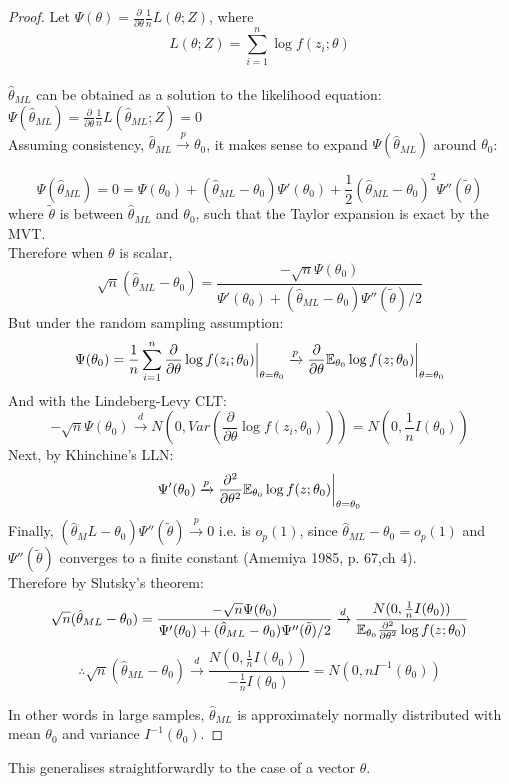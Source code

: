 \documentclass[DIV=14,titlepage=false]{scrreprt}
\begin{document}
\begin{proof}
Let \(\Psi(\theta)=\frac{\partial}{\partial\theta}\frac{1}{n}L (\theta;Z)\), where
\[L(\theta;Z)=\sum_{i=1}^n\log f(z_i;\theta)\]
\\\(\hat{\theta}_{ML}\) can be obtained as a solution to the likelihood equation: \(\Psi(\hat{\theta}_{ML})=\frac{\partial}{\partial\theta}\frac{1}{n}L (\hat\theta_{ML};Z)=0\)
\\ Assuming consistency, \(\hat{\theta}_{ML}\xrightarrow{p}\theta_0\), it makes sense to expand \(\Psi(\hat{\theta}_{ML})\) around \(\theta_0\):

\[\Psi(\hat{\theta}_{ML})=0=\Psi(\theta_0)+(\hat{\theta}_{ML}-\theta_0)\Psi'(\theta_0)+\frac{1}{2}(\hat{\theta}_{ML}-\theta_0)^2\Psi''(\tilde{\theta})\]
where \(\tilde{\theta}\) is between \(\hat{\theta}_{ML}\) and \(\theta_0\), such that the Taylor expansion is exact by the MVT.
\\Therefore when \(\theta\) is scalar,
\[\sqrt{n}(\hat{\theta}_{ML}-\theta_0)=\frac{-\sqrt{n}\Psi(\theta_0)}{\Psi'(\theta_0)+(\hat{\theta}_{ML}-\theta_0)\Psi''(\tilde{\theta})/2}\]
But under the random sampling assumption:
\[\Psi(\theta_0)=\frac{1}{n}\sum_{i=1}^n\frac{\partial}{\partial\theta}\log f(z_i;\theta_0)\bigg|_{\theta=\theta_0}\xrightarrow{p}\frac{\partial}{\partial\theta}\mathbb{E}_{\theta_0}\log f(z;\theta_0)\bigg|_{\theta=\theta_0}\]
And with the Lindeberg-Levy CLT:
\[-\sqrt{n}\Psi(\theta_0)\xrightarrow{d}N\left(0,Var\left(\frac{\partial}{\partial\theta}\log f(z_i,\theta_0)\right)\right)=N\left(0,\frac{1}{n}I(\theta_0)\right)\]
Next, by Khinchine's LLN:
\[\Psi'(\theta_0)\xrightarrow{p}\frac{\partial^2}{\partial\theta^2}\mathbb{E}_{\theta_0}\log f(z;\theta_0)\bigg|_{\theta=\theta_0}\]
Finally, \(({\hat\theta_ML}-\theta_0)\Psi''(\tilde{\theta})\xrightarrow{p}0\) i.e. is \(o_p(1)\), since \(\hat{\theta}_{ML}-\theta_0 = o_p(1)\) and \(\Psi''(\tilde{\theta})\) converges to a finite constant (Amemiya 1985, p. 67,ch 4).
\\ Therefore by Slutsky's theorem:
\[\sqrt{n}(\hat{\theta}_{ML}-\theta_0)=\frac{-\sqrt{n}\Psi(\theta_0)}{\Psi'(\theta_0)+(\hat{\theta}_{ML}-\theta_0)\Psi''(\tilde{\theta})/2}\xrightarrow{d}\frac{N(0,\frac{1}{n}I(\theta_0))}{\mathbb{E}_{\theta_0}\frac{\partial^2}{\partial\theta^2}\log f(z;\theta_0)}\]
\[\therefore \sqrt{n}(\hat{\theta}_{ML}-\theta_0)\xrightarrow{d}\frac{N(0,\frac{1}{n}I(\theta_0))}{-\frac{1}{n}I(\theta_0)}=N(0,nI^{-1}(\theta_0))\]

In other words in large samples, \(\hat{\theta}_{ML}\) is approximately normally distributed with mean \(\theta_0\) and variance \(I^{-1}(\theta_0)\). 
\end{proof}
This generalises straightforwardly to the case of a vector \(\theta\).
\end{document}
